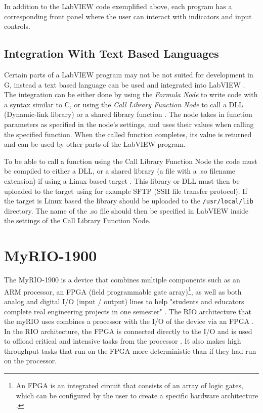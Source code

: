 In addition to the LabVIEW code exemplified above, each program has a corresponding front panel where the user can interact with indicators and input controls. \cite{Andrade1998SoftwareTM}

\subsection{Integration With Text Based Languages} \label{theory:text_based}
Certain parts of a LabVIEW program may not be not suited for development in G, instead a text based language can be used and integrated into LabVIEW \cite{NationalInstruments2022BenefitsLabVIEW}. The integration can be either done by using the \textit{Formula Node} to write code with a syntax similar to C, or using the \textit{Call Library Function Node} to call a DLL (Dynamic-link library) or a shared library function \cite{Nationalinstruments2018CallNode}. The node takes in function parameters as specified in the node's settings, and uses their values when calling the specified function. When the called function completes, its value is returned and can be used by other parts of the LabVIEW program.

To be able to call a function using the Call Library Function Node the code must be compiled to either a DLL, or a shared library (a file with a .so filename extension) if using a Linux based target \cite{NationalInstruments2021CreatingTarget}. This library or DLL must then be uploaded to the target using for example SFTP (SSH file transfer protocol). If the target is Linux based the library should be uploaded to the \texttt{/usr/local/lib} directory. The name of the .so file should then be specified in LabVIEW inside the settings of the Call Library Function Node.

\section{MyRIO-1900}
The MyRIO-1900 is a device that combines multiple components such as an ARM processor, an FPGA (field programmable gate array)\footnote{An FPGA is an integrated circuit that consists of an array of logic gates, which can be configured by the user to create a specific hardware architecture \cite{Trochimiuk2021FPGAUsed}.}, as well as both analog and digital I/O (input / output) lines to help "students and educators complete real engineering projects in one semester" \cite{NationalInstruments2022MyRIO-1900}. The RIO architecture that the myRIO uses combines a processor with the I/O of the device via an FPGA \cite{NationalInstruments2020TheInnovation, NationalInstruments2022FromNI}. In the RIO architecture, the FPGA is connected directly to the I/O and is used to offload critical and intensive tasks from the processor \cite{NationalInstruments2022FromNI}. It also makes high throughput tasks that run on the FPGA more deterministic than if they had run on the processor.

